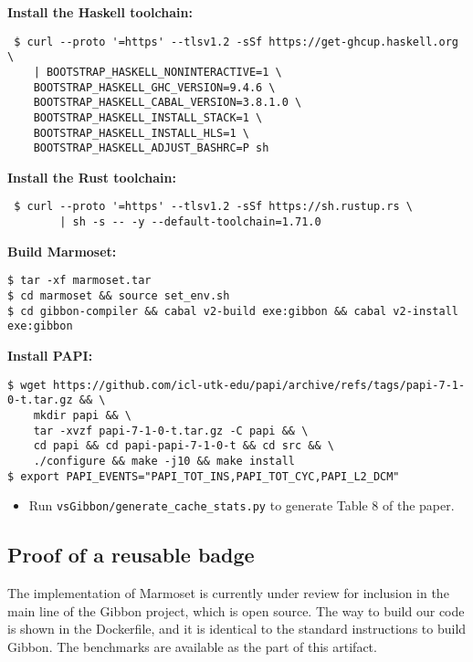 \textbf{Install the Haskell toolchain:}
\begin{verbatim}
 $ curl --proto '=https' --tlsv1.2 -sSf https://get-ghcup.haskell.org \ 
    | BOOTSTRAP_HASKELL_NONINTERACTIVE=1 \
    BOOTSTRAP_HASKELL_GHC_VERSION=9.4.6 \ 
    BOOTSTRAP_HASKELL_CABAL_VERSION=3.8.1.0 \ 
    BOOTSTRAP_HASKELL_INSTALL_STACK=1 \ 
    BOOTSTRAP_HASKELL_INSTALL_HLS=1 \
    BOOTSTRAP_HASKELL_ADJUST_BASHRC=P sh
\end{verbatim}

\textbf{Install the Rust toolchain:}
\begin{verbatim}
 $ curl --proto '=https' --tlsv1.2 -sSf https://sh.rustup.rs \
        | sh -s -- -y --default-toolchain=1.71.0
\end{verbatim}

\textbf{Build Marmoset:}
\begin{verbatim}
$ tar -xf marmoset.tar
$ cd marmoset && source set_env.sh
$ cd gibbon-compiler && cabal v2-build exe:gibbon && cabal v2-install exe:gibbon
\end{verbatim}

\textbf{Install PAPI:}
\begin{verbatim}
$ wget https://github.com/icl-utk-edu/papi/archive/refs/tags/papi-7-1-0-t.tar.gz && \
    mkdir papi && \
    tar -xvzf papi-7-1-0-t.tar.gz -C papi && \
    cd papi && cd papi-papi-7-1-0-t && cd src && \
    ./configure && make -j10 && make install
$ export PAPI_EVENTS="PAPI_TOT_INS,PAPI_TOT_CYC,PAPI_L2_DCM"
\end{verbatim}

\begin{itemize}
\tightlist
\item
  Run \texttt{vsGibbon/generate\_cache\_stats.py} to generate Table 8 of
  the paper.
\end{itemize}

\hypertarget{for-authors-claiming-a-reusable-badge}{%
\subsection{Proof of a reusable badge}\label{for-authors-claiming-a-reusable-badge}}

The implementation of Marmoset is currently under review for inclusion
in the main line of the Gibbon project, which is open source. The way to
build our code is shown in the Dockerfile, and it is identical to the
standard instructions to build Gibbon. The benchmarks are available as
the part of this artifact.

